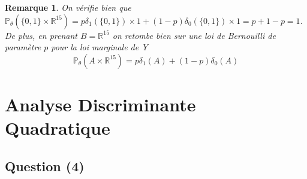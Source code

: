 \documentclass[10pt,a4paper]{report}\usepackage[]{graphicx}\usepackage[]{color}
\newtheorem*{rmq}{Remarque}
\begin{document}
\begin{rmq}
On vérifie bien que \(\mathbb{P}_{\theta}(\{0,1\} \times \mathbb{R}^{15}) = p\delta_1(\{0,1\}) \times 1 + (1-p)\delta_0(\{0,1\}) \times 1 = p + 1 - p = 1 \). De plus, en prenant $B = \mathbb{R}^{15}$ on retombe bien sur une loi de Bernouilli de paramètre $p$ pour la loi marginale de Y \[ \mathbb{P}_{\theta}(A \times \mathbb{R}^{15}) = p\delta_1(A) + (1-p)\delta_0(A)\] 
\end{rmq}



\section{Analyse Discriminante Quadratique}

\subsection{Question (4)}
\end{document}
